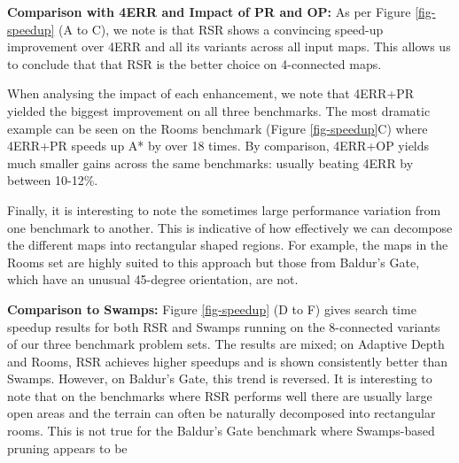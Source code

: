 \par \noindent \newline
\textbf{Comparison with 4ERR and Impact of PR and OP:}
As per Figure \ref{fig-speedup} (A to C), we note is that RSR shows a convincing 
speed-up improvement over 4ERR and all its variants across all input maps.
This allows us to conclude that that RSR is the better choice on 4-connected maps.
\par
When analysing the impact of each enhancement, we note that 4ERR+PR yielded the
biggest improvement on all three benchmarks.
The most dramatic example can be seen on the Rooms benchmark (Figure \ref{fig-speedup}C) 
where 4ERR+PR speeds up A* by over 18 times.
By comparison, 4ERR+OP yields much smaller gains across the same
benchmarks: usually beating 4ERR by between 10-12\%.
\par
Finally, it is interesting to note the sometimes large performance variation 
from one benchmark to another. This is indicative of how effectively we can 
decompose the different maps into rectangular shaped regions.
For example, the maps in the Rooms set are highly suited to this approach but those
from Baldur's Gate, which have an unusual 45-degree orientation, are not.
\par \noindent \newline
\textbf{Comparison to Swamps:}
Figure \ref{fig-speedup} (D to F) gives search time speedup results for both RSR
and Swamps running on the 8-connected variants of our three benchmark problem
sets.  The results are mixed; on Adaptive Depth and Rooms, RSR achieves higher
speedups and is shown consistently better than Swamps. However, on Baldur's
Gate, this trend is reversed.  
It is interesting to note that on the
benchmarks where RSR performs well there are usually large open areas and the
terrain can often be naturally decomposed into rectangular rooms.  This is not
true for the Baldur's Gate benchmark where Swamps-based pruning appears to be
